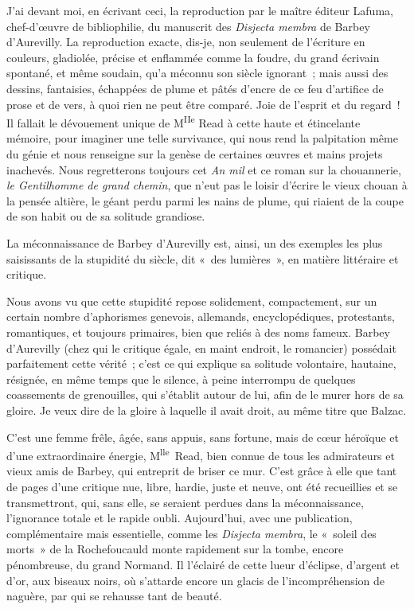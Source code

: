 \documentclass[french,twoside]{book} %
\begin{document}
J’ai devant moi, en écrivant ceci, la reproduction par le maître éditeur Lafuma, chef-d’œuvre de bibliophilie, du manuscrit des {\itshape Disjecta membra} de Barbey d’Aurevilly. La reproduction exacte, dis-je, non seulement de l’écriture en couleurs, gladiolée, précise et enflammée comme la foudre, du grand écrivain spontané, et même soudain, qu’a méconnu son siècle ignorant ; mais aussi des dessins, fantaisies, échappées de plume et pâtés d’encre de ce feu d’artifice de prose et de vers, à quoi rien ne peut être comparé. Joie de l’esprit et du regard ! Il fallait le dévouement unique de M\textsuperscript{IIe} Read à cette haute et étincelante mémoire, pour imaginer une telle survivance, qui nous rend la palpitation même du génie et nous renseigne sur la genèse de certaines œuvres et mains projets inachevés. Nous regretterons toujours cet {\itshape An mil} et ce roman sur la chouannerie, {\itshape le Gentilhomme de grand chemin}, que n’eut pas le loisir d’écrire le vieux chouan à la pensée altière, le géant perdu parmi les nains de plume, qui riaient de la coupe de son habit ou de sa solitude grandiose.\par
La méconnaissance de Barbey d’Aurevilly est, ainsi, un des exemples les plus saisissants de la stupidité du siècle, dit « des lumières », en matière littéraire et critique.\par
Nous avons vu que cette stupidité repose solidement, compactement, sur un certain nombre d’aphorismes genevois, allemands, encyclopédiques, protestants, romantiques, et toujours primaires, bien que reliés à des noms fameux. Barbey d’Aurevilly (chez qui le critique égale, en maint endroit, le romancier) possédait parfaitement cette vérité ; c’est ce qui explique sa solitude volontaire, hautaine, résignée, en même temps que le silence, à peine interrompu de quelques coassements de grenouilles, qui s’établit autour de lui, afin de le murer hors de sa gloire. Je veux dire de la gloire à laquelle il avait droit, au même titre que Balzac.\par
C’est une femme frêle, âgée, sans appuis, sans fortune, mais de cœur héroïque et d’une extraordinaire énergie, M\textsuperscript{lle} Read, bien connue de tous les admirateurs et vieux amis de Barbey, qui entreprit de briser ce mur. C’est grâce à elle que tant de pages d’une critique nue, libre, hardie, juste et neuve, ont été recueillies et se transmettront, qui, sans elle, se seraient perdues dans la méconnaissance, l’ignorance totale et le rapide oubli. Aujourd’hui, avec une publication, complémentaire mais essentielle, comme les {\itshape Disjecta membra}, le « soleil des morts » de la Rochefoucauld monte rapidement sur la tombe, encore pénombreuse, du grand Normand. Il l’éclairé de cette lueur d’éclipse, d’argent et d’or, aux biseaux noirs, où s’attarde encore un glacis de l’incompréhension de naguère, par qui se rehausse tant de beauté.\par
\end{document}

